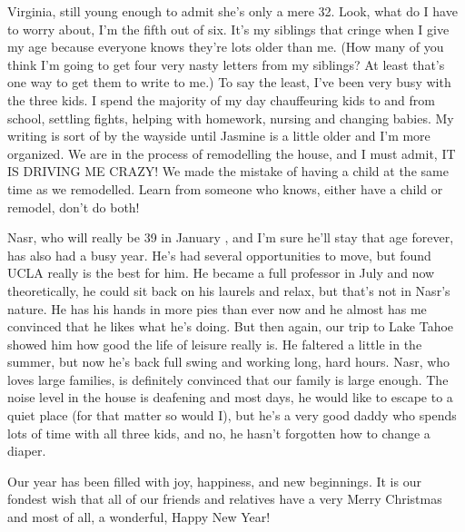 Virginia, still young enough to admit she's only a mere 32.  Look, what do I have to worry about, I'm the fifth out of six.  It's my siblings
that cringe when I give my age because everyone knows they're lots older than me.  (How many of you think I'm going to get four very nasty
letters from my siblings? At least that's one way to get them to write to me.)  To say the least, I've been very busy with the three kids.  I
spend the majority of my day chauffeuring kids to and from school, settling fights, helping with homework, nursing and changing babies.  My
writing is sort of by the wayside until Jasmine is a little older and I'm more organized.  We are in the process of remodelling the house, and I
must admit, IT IS DRIVING ME CRAZY!  We made the mistake of having a child at the same time as we remodelled.  Learn from someone who knows,
either have a child or remodel, don't do both!

Nasr, who will really be 39 in January , and I'm sure he'll stay that age forever, has also had a busy year.    He's had several opportunities
to move, but found UCLA really is the best for him.  He became a full professor in July and now theoretically, he could sit back on his laurels
and relax, but that's not in Nasr's nature.  He has his hands in more pies than ever now and he almost has me convinced that he likes what he's
doing.  But then again, our trip to Lake Tahoe showed him how good the life of leisure really is.  He faltered a little in the summer, but now
he's back full swing and working long, hard hours.  Nasr, who loves large families, is definitely convinced that our family is large enough. The
noise level in the house is deafening and most days, he would like to escape to a quiet place (for that matter so would I), but he's a very good
daddy who spends lots of time with all three kids, and no, he hasn't forgotten how to change a diaper.

Our year has been filled with joy, happiness, and new beginnings. It is our fondest wish that all of our friends and relatives have a very Merry
Christmas and most of all, a wonderful, Happy New Year!


%
